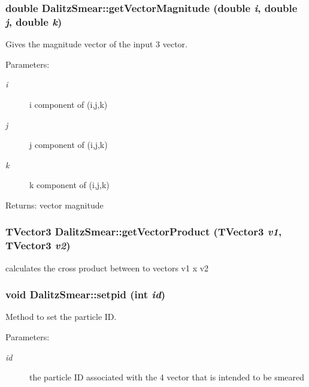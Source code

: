\subsubsection{\setlength{\rightskip}{0pt plus 5cm}double Dalitz\-Smear::get\-Vector\-Magnitude (double {\em i}, double {\em j}, double {\em k})\hspace{0.3cm}{\tt  [private]}}\label{classDalitzSmear_3cb72fe8ffc410b85b1d9c451954448a}


Gives the magnitude vector of the input 3 vector. 

\begin{Desc}
\item[Parameters:]
\begin{description}
\item[{\em i}]i component of (i,j,k) \item[{\em j}]j component of (i,j,k) \item[{\em k}]k component of (i,j,k) \end{description}
\end{Desc}
\begin{Desc}
\item[Returns:]vector magnitude \end{Desc}
\subsubsection{\setlength{\rightskip}{0pt plus 5cm}TVector3 Dalitz\-Smear::get\-Vector\-Product (TVector3 {\em v1}, TVector3 {\em v2})\hspace{0.3cm}{\tt  [private]}}\label{classDalitzSmear_f21d38f7a616dcb5b865e873d64201f7}


calculates the cross product between to vectors v1 x v2 

\subsubsection{\setlength{\rightskip}{0pt plus 5cm}void Dalitz\-Smear::setpid (int {\em id})}\label{classDalitzSmear_63e8f796d9c84111327341c3eefec43a}


Method to set the particle ID. 

\begin{Desc}
\item[Parameters:]
\begin{description}
\item[{\em id}]the particle ID associated with the 4 vector that is intended to be smeared \end{description}
\end{Desc}
